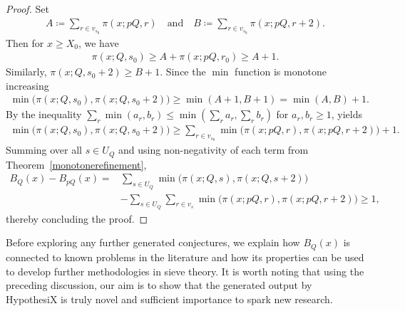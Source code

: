 \documentclass[11pt,reqno]{amsart}
\theoremstyle{plain}\newtheorem{theorem}{Theorem}[section]
\numberwithin{equation}{section}
\begin{document}
\begin{proof}
\medskip
Set
\begin{align*}
A
\coloneqq\sum_{r\in v_{s_0}}\pi(x;pQ,r)\quad\text{and}\quad
B
\coloneqq\sum_{r\in v_{s_0}}\pi(x;pQ,r+2).
\end{align*}
Then for $x\geq X_0$, we have
\begin{align*}
\pi(x;Q,s_0)
\geq A +\pi(x;pQ,r_0)\geq A+1.
\end{align*}
Similarly, $\pi(x;Q,s_0+2)\geq B+1$. Since the $\min$ function is monotone increasing
\begin{align*}
\min\bigl(\pi(x; Q, s_0),\pi(x; Q, s_0 + 2)\bigr)
\geq\min(A+1, B+1) 
=\min(A,B)+1.    
\end{align*}
By the inequality $\sum_{r}\min(a_r,b_r)\leq\min(\sum_{r}a_r,\sum_{r}b_r)$ for $a_r,b_r\geq 1$, yields
\begin{align*}
\min\bigl(\pi(x;Q,s_0),\pi(x; Q, s_0 + 2)\bigr)
\geq\sum_{r\in v_{s_0}}\min\bigl(\pi(x;pQ,r),\pi(x;pQ,r+2)\bigr)+1.    
\end{align*}
Summing over all $s\in U_Q$ and using non-negativity of each term from Theorem~\ref{monotonerefinement}, 
\begin{align*}
B_Q(x)-B_{pQ}(x)
=&\sum_{s\in U_Q}\min\bigl(\pi(x;Q,s),\pi(x;Q,s+2)\bigr)\\
&-\sum_{s\in U_Q}\sum_{r\in v_s} \min\bigl(\pi(x;pQ,r),\pi(x;pQ,r+2)\bigr)
\ge 1,    
\end{align*}
thereby concluding the proof.
\end{proof}

\noindent
Before exploring any further generated conjectures, we explain how $B_Q(x)$ is connected to known problems in the literature and how its properties can be used to develop further methodologies in sieve theory. It is worth noting that using the preceding discussion, our aim is to show that the generated output by HypothesiX is truly novel and sufficient importance to spark new research.   
\end{document}
